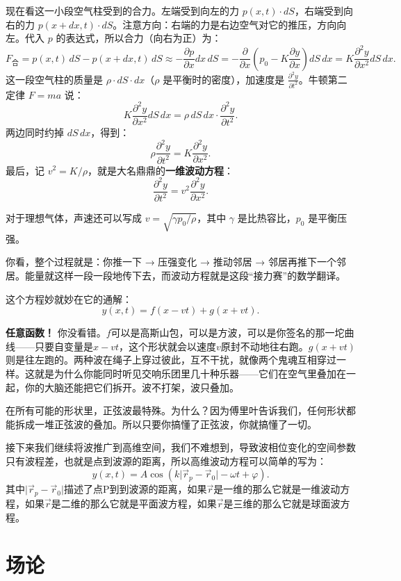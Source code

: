 \documentclass[UTF8]{ctexbook}
\begin{document}
现在看这一小段空气柱受到的合力。左端受到向左的力 $p(x,t) \cdot dS$，右端受到向右的力 $p(x+dx,t) \cdot dS$。注意方向：右端的力是右边空气对它的推压，方向向左。代入 $p$ 的表达式，所以合力（向右为正）为：
\[
F_{\text{合}} = p(x,t)\,dS - p(x+dx,t)\,dS \approx -\frac{\partial p}{\partial x}dx\,dS= -\frac{\partial}{\partial x}\left(p_0 - K\frac{\partial y}{\partial x}\right) dS\,dx = K \frac{\partial^2 y}{\partial x^2} dS\,dx.
\]
这一段空气柱的质量是 $\rho \cdot dS \cdot dx$（$\rho$ 是平衡时的密度），加速度是 $\frac{\partial^2 y}{\partial t^2}$。牛顿第二定律 $F = ma$ 说：
\[
K \frac{\partial^2 y}{\partial x^2} dS\,dx = \rho \, dS\,dx \cdot \frac{\partial^2 y}{\partial t^2}.
\]
两边同时约掉 $dS\,dx$，得到：
\[
\rho \frac{\partial^2 y}{\partial t^2} = K \frac{\partial^2 y}{\partial x^2}.
\]
最后，记 $v^2 = K/\rho$，就是大名鼎鼎的\textbf{一维波动方程}：
\[
\frac{\partial^2 y}{\partial t^2} = v^2 \frac{\partial^2 y}{\partial x^2}.
\]

对于理想气体，声速还可以写成 $v = \sqrt{\gamma p_0 / \rho}$，其中 $\gamma$ 是比热容比，$p_0$ 是平衡压强。

你看，整个过程就是：你推一下 → 压强变化 → 推动邻居 → 邻居再推下一个邻居。能量就这样一段一段地传下去，而波动方程就是这段“接力赛”的数学翻译。

这个方程妙就妙在它的通解：
\[
y(x,t) = f(x - vt) + g(x + vt).
\]

\textbf{任意函数！} 你没看错。$f$可以是高斯山包，可以是方波，可以是你签名的那一坨曲线——只要自变量是$x-vt$，这个形状就会以速度$v$原封不动地往右跑。$g(x+vt)$则是往左跑的。两种波在绳子上穿过彼此，互不干扰，就像两个鬼魂互相穿过一样。这就是为什么你能同时听见交响乐团里几十种乐器——它们在空气里叠加在一起，你的大脑还能把它们拆开。波不打架，波只叠加。

在所有可能的形状里，正弦波最特殊。为什么？因为傅里叶告诉我们，任何形状都能拆成一堆正弦波的叠加。所以只要你搞懂了正弦波，你就搞懂了一切。

接下来我们继续将波推广到高维空间，我们不难想到，导致波相位变化的空间参数只有波程差，也就是点到波源的距离，所以高维波动方程可以简单的写为：
\[
y(x,t) = A\cos(k \rvert \vec{r}_p-\vec{r}_0 \rvert - \omega t + \varphi).
\]
其中$\rvert \vec{r}_p-\vec{r}_0 \rvert$描述了点P到到波源的距离，如果$\vec{r}$是一维的那么它就是一维波动方程，如果$\vec{r}$是二维的那么它就是平面波方程，如果$\vec{r}$是三维的那么它就是球面波方程。






\chapter{场论}
\end{document}
